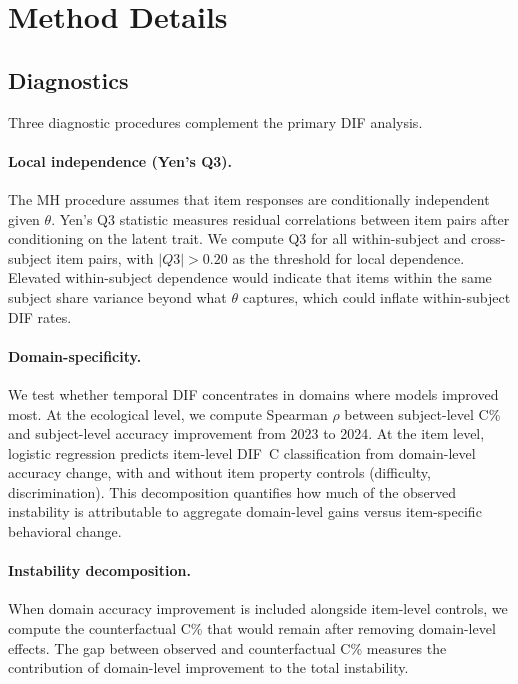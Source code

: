 \section{Method Details}
\label{app:method_details}

\subsection{Diagnostics}
\label{app:diagnostics}

Three diagnostic procedures complement the primary DIF analysis.

\paragraph{Local independence (Yen's Q3).} The MH procedure assumes that item responses are conditionally independent given $\theta$. Yen's Q3 statistic measures residual correlations between item pairs after conditioning on the latent trait. We compute Q3 for all within-subject and cross-subject item pairs, with $|Q3| > 0.20$ as the threshold for local dependence. Elevated within-subject dependence would indicate that items within the same subject share variance beyond what $\theta$ captures, which could inflate within-subject DIF rates.

\paragraph{Domain-specificity.} We test whether temporal DIF concentrates in domains where models improved most. At the ecological level, we compute Spearman $\rho$ between subject-level C\% and subject-level accuracy improvement from 2023 to 2024. At the item level, logistic regression predicts item-level DIF~C classification from domain-level accuracy change, with and without item property controls (difficulty, discrimination). This decomposition quantifies how much of the observed instability is attributable to aggregate domain-level gains versus item-specific behavioral change.

\paragraph{Instability decomposition.} When domain accuracy improvement is included alongside item-level controls, we compute the counterfactual C\% that would remain after removing domain-level effects. The gap between observed and counterfactual C\% measures the contribution of domain-level improvement to the total instability.

